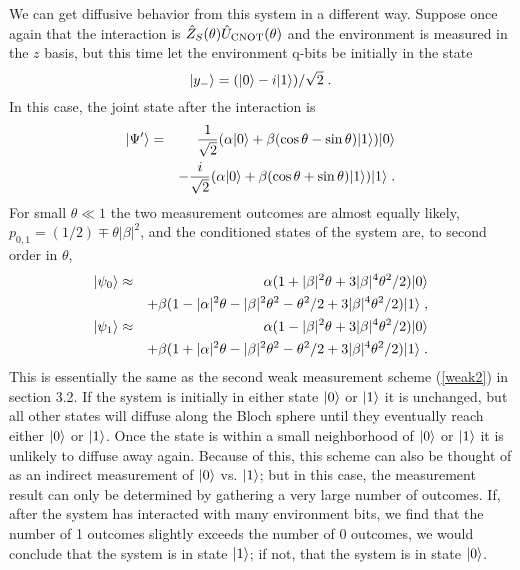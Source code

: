 We can get diffusive behavior from this system in a different way.
Suppose once again that the interaction is
${\hat Z}_S(\theta){\hat U}_{\rm CNOT}(\theta)$
and the environment is measured in the $z$ basis, but this time let the
environment q-bits be initially in the state
\begin{equation}
{| y_- \rangle} = ({| 0 \rangle} - i{| 1 \rangle})/\sqrt2 \;.
\end{equation}
In this case, the joint state after the interaction is
\begin{eqnarray}
{| \Psi' \rangle} &=& {1\over\sqrt2}(\alpha{| 0 \rangle}
  + \beta(\cos\theta-\sin\theta){| 1 \rangle} ) {| 0 \rangle} \nonumber\\
&& - {i\over\sqrt2}(\alpha{| 0 \rangle}
  + \beta(\cos\theta+\sin\theta){| 1 \rangle} ) {| 1 \rangle} \;.
\end{eqnarray}
For small $\theta\ll1$ the two measurement outcomes are almost equally
likely, $p_{0,1} = (1/2) \mp \theta|\beta|^2$, and the conditioned states
of the system are, to second order in $\theta$,
\begin{eqnarray}
{| \psi_0 \rangle} &\approx&
 \alpha(1+|\beta|^2\theta+3|\beta|^4\theta^2/2){| 0 \rangle} \nonumber\\
&& + \beta(1-|\alpha|^2\theta
 - |\beta|^2\theta^2 - \theta^2/2 + 3|\beta|^4\theta^2/2){| 1 \rangle} \;, \nonumber\\
{| \psi_1 \rangle} &\approx&
 \alpha(1-|\beta|^2\theta+3|\beta|^4\theta^2/2){| 0 \rangle} \nonumber\\
&& + \beta(1+|\alpha|^2\theta
 - |\beta|^2\theta^2 - \theta^2/2 + 3|\beta|^4\theta^2/2){| 1 \rangle} \;.
\end{eqnarray}
This is essentially the same as
the second weak measurement scheme (\ref{weak2}) in section 3.2.
If the system is initially in either state ${| 0 \rangle}$ or ${| 1 \rangle}$ it is unchanged,
but all other states will diffuse along the Bloch sphere until they eventually
reach either ${| 0 \rangle}$ or ${| 1 \rangle}$.  Once the state is within a small
neighborhood of ${| 0 \rangle}$ or ${| 1 \rangle}$ it is unlikely to diffuse away again.
Because of this, this scheme can also be thought of as an indirect
measurement of ${| 0 \rangle}$ vs. ${| 1 \rangle}$; but in this case, the measurement
result can only be determined by gathering a very large number of outcomes.
If, after the system has interacted with many environment bits, we
find that the number of 1 outcomes slightly exceeds the number of 0 outcomes,
we would conclude that the system is in state ${| 1 \rangle}$; if not, that the
system is in state ${| 0 \rangle}$.

